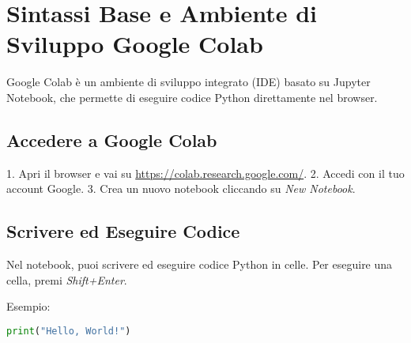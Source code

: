 \section{Sintassi Base e Ambiente di Sviluppo Google Colab}
Google Colab è un ambiente di sviluppo integrato (IDE) basato su Jupyter Notebook, che permette di eseguire codice Python direttamente nel browser.

\subsection{Accedere a Google Colab}
1. Apri il browser e vai su \url{https://colab.research.google.com/}.
2. Accedi con il tuo account Google.
3. Crea un nuovo notebook cliccando su \textit{New Notebook}.

\subsection{Scrivere ed Eseguire Codice}
Nel notebook, puoi scrivere ed eseguire codice Python in celle. Per eseguire una cella, premi \textit{Shift+Enter}.

Esempio:
\begin{lstlisting}[language=Python]
print("Hello, World!")
\end{lstlisting}

